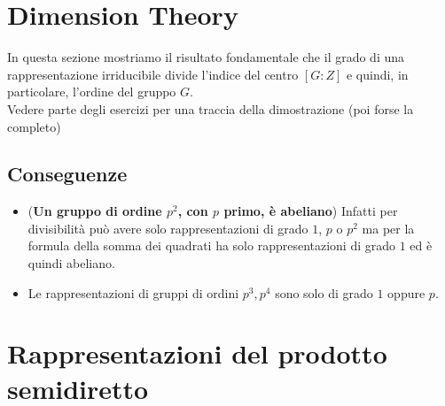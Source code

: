 \documentclass[a4paper,NoNotes,GeneralMath]{stdmdoc}
\begin{document}
	\section{Dimension Theory}
	In questa sezione mostriamo il risultato fondamentale che il grado di una rappresentazione irriducibile divide l'indice del centro $[G:Z]$ e quindi, in particolare, l'ordine del gruppo $G$. \\
	Vedere parte degli esercizi per una traccia della dimostrazione (poi forse la completo)

	\subsection{Conseguenze}
	\begin{itemize}
		\item ({\bf Un gruppo di ordine $p^2$, con $p$ primo, è abeliano}) Infatti per divisibilità può avere solo rappresentazioni di grado $1$, $p$ o $p^2$ ma per la formula della somma dei quadrati ha solo rappresentazioni di grado $1$ ed è quindi abeliano.
		\item Le rappresentazioni di gruppi di ordini $p^3, p^4$ sono solo di grado $1$ oppure $p$.
	\end{itemize}

	\section{Rappresentazioni del prodotto semidiretto}
\end{document}

